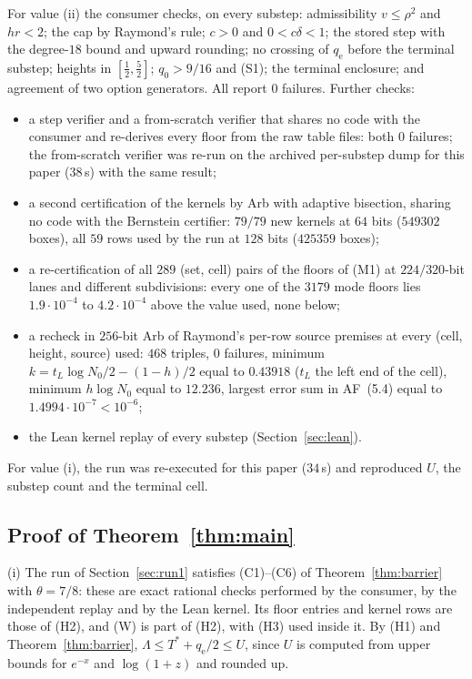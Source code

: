 \documentclass[11pt]{article}
\theoremstyle{definition}
\newcommand{\LB}{\Lambda}
\newcommand{\qe}{q_{\mathrm e}}
\begin{document}
For value (ii) the consumer checks, on every substep: admissibility $v\le\rho^2$ and
$hr<2$; the cap by Raymond's rule; $c>0$ and $0<c\delta<1$; the stored step with the
degree-$18$ bound and upward rounding; no crossing of $\qe$ before the terminal substep;
heights in $[\frac12,\frac52]$; $q_0>9/16$ and (S1); the terminal enclosure; and agreement
of two option generators. All report $0$ failures. Further checks:
\begin{itemize}[leftmargin=1.6em]
\item a step verifier and a from-scratch verifier that shares no code with the consumer and
re-derives every floor from the raw table files: both $0$ failures; the from-scratch
verifier was re-run on the archived per-substep dump for this paper ($38$\,s) with the same
result;
\item a second certification of the kernels by Arb with adaptive bisection, sharing no code
with the Bernstein certifier: $79/79$ new kernels at $64$ bits ($549302$ boxes), all $59$ rows
used by the run at $128$ bits ($425359$ boxes);
\item a re-certification of all $289$ (set, cell) pairs of the floors of (M1) at $224/320$-bit
lanes and different subdivisions: every one of the $3179$ mode floors lies $1.9\cdot10^{-4}$ to
$4.2\cdot10^{-4}$ above the value used, none below;
\item a recheck in $256$-bit Arb of Raymond's per-row source premises at every (cell, height,
source) used: $468$ triples, $0$ failures, minimum $k=t_L\log N_0/2-(1-h)/2$ equal to $0.43918$ ($t_L$ the left end of the cell),
minimum $h\log N_0$ equal to $12.236$, largest error sum in AF~(5.4) equal to
$1.4994\cdot10^{-7}<10^{-6}$;
\item the Lean kernel replay of every substep (Section~\ref{sec:lean}).
\end{itemize}
For value (i), the run was re-executed for this paper ($34$\,s) and reproduced $U$, the
substep count and the terminal cell.

\subsection{Proof of Theorem~\ref{thm:main}}

(i) The run of Section~\ref{sec:run1} satisfies (C1)--(C6) of Theorem~\ref{thm:barrier} with
$\theta=7/8$: these are exact rational checks performed by the consumer, by the independent
replay and by the Lean kernel. Its floor entries and kernel rows are those of (H2), and (W)
is part of (H2), with (H3) used inside it. By (H1) and Theorem~\ref{thm:barrier},
$\LB\le T^*+\qe/2\le U$, since $U$ is computed from upper bounds for $e^{-x}$ and
$\log(1+z)$ and rounded up.
\end{document}
